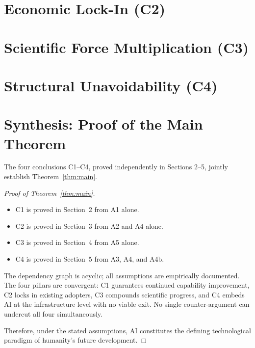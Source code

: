 \documentclass[12pt]{article}
\begin{document}


\newpage
\section{Economic Lock-In (C2)}



\newpage
\section{Scientific Force Multiplication (C3)}



\newpage
\section{Structural Unavoidability (C4)}



\newpage
\section{Synthesis: Proof of the Main Theorem}

The four conclusions C1--C4, proved independently in Sections 2--5,
jointly establish Theorem~\ref{thm:main}.

\begin{proof}[Proof of Theorem~\ref{thm:main}]
  \begin{itemize}
    \item C1 is proved in Section~2 from A1 alone.
    \item C2 is proved in Section~3 from A2 and A4 alone.
    \item C3 is proved in Section~4 from A5 alone.
    \item C4 is proved in Section~5 from A3, A4, and A4b.
  \end{itemize}
  The dependency graph is acyclic; all assumptions are empirically
  documented.  The four pillars are convergent: C1 guarantees
  continued capability improvement, C2 locks in existing adopters,
  C3 compounds scientific progress, and C4 embeds AI at the
  infrastructure level with no viable exit.  No single counter-argument
  can undercut all four simultaneously.

  Therefore, under the stated assumptions, AI constitutes the defining
  technological paradigm of humanity's future development.
\end{proof}
\end{document}
